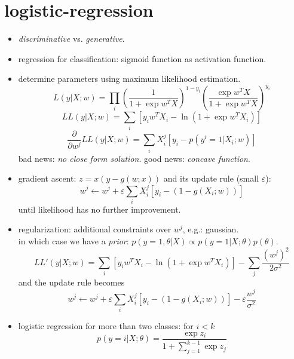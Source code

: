 \documentclass{article}
\begin{document}
\section{logistic-regression}
\begin{itemize}\parskip2pt
	\item \emph{discriminative} vs. \emph{generative}.
	\item regression for classification: sigmoid function as activation function.
	\item determine parameters using maximum likelihood estimation. 
		\begin{equation}
			L\left(y|X;w\right)=\prod_i\left(\frac{1}{1+\exp{w^TX}}\right)^{1-y_i}
				\left(\frac{\exp{w^TX}}{1+\exp{w^TX}}\right)^{y_i}
		\end{equation}
		\begin{equation}
			LL\left(y|X;w\right)=\sum_i\left[y_iw^TX_i-\ln\left(1+\exp{w^TX_i}\right)\right]
		\end{equation}
		\begin{equation}
			\frac{\partial}{\partial w^j}LL\left(y|X;w\right)=
			\sum_iX_i^j\left[y_i-p\left(y^i=1|X_i;w\right)\right]
		\end{equation}
		bad news: {\it no close form solution}.
		good news: {\it concave function}.
	\item gradient ascent: $z=x(y-g(w;x))$ and its update rule (small $\varepsilon$):
		\begin{equation}
			w^j\leftarrow w^j+\varepsilon\sum_iX_i^j\left[y_i-(1-g(X_i;w))\right]
		\end{equation}
		until likelihood has no further improvement. 
	\item regularization: additional constraints over $w^j$, e.g.: gaussian. \\
		in which case we have a \emph{prior}: $p(y=1,\theta|X)\propto p(y=1|X;\theta)p(\theta)$.
		\begin{equation}
			LL'\left(y|X;w\right)=\sum_i\left[y_iw^TX_i-\ln\left(1+\exp{w^TX_i}\right)\right]
				-\sum_j\frac{(w^j)^2}{2\sigma^2}
		\end{equation}
		and the update rule becomes
		\begin{equation}
			w^j\leftarrow w^j+\varepsilon\sum_iX_i^j\left[y_i-(1-g(X_i;w))\right]
				-\varepsilon\frac{w^j}{\sigma^2}
		\end{equation}
	\item logistic regression for more than two classes: for $i<k$
		\begin{equation}
			p(y=i|X;\theta)=\frac{\exp z_i}{1+\sum_{j=1}^{k-1}\exp{z_j}}

\end{equation}
\end{itemize}
\end{document}
